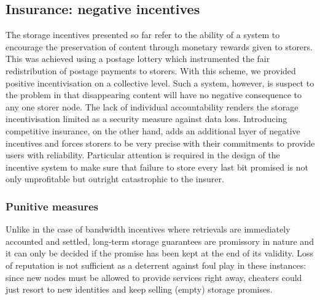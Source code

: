 




\subsection{Insurance: negative incentives \statusorange}\label{sec:chunk-insurance}


The storage incentives presented so far refer to the ability of a system to encourage the preservation of content through monetary rewards given to storers. This was achieved using a postage lottery which instrumented the fair redistribution of postage payments to storers. With this scheme, we provided positive incentivisation on a collective level. Such a system,  however, is suspect to the  problem in that disappearing content will have no negative consequence to any one storer node. The lack of individual accountability renders the storage incentivisation limited as a security measure against data loss. Introducing competitive insurance, on the other hand, adds an additional layer of negative incentives and forces storers to be very precise with their commitments to provide users with reliability. Particular attention is required in the design of the incentive system to make sure that failure to store every last bit promised is not only unprofitable but outright catastrophic to the insurer. 

\subsubsection{Punitive measures}

Unlike in the case of bandwidth incentives where retrievals are immediately accounted and settled, long-term storage guarantees are promissory in nature and it can only be decided if the promise has been kept at the end of its validity. Loss of reputation is not sufficient as a deterrent against foul play in these instances: since new nodes must be allowed to provide services right away, cheaters could just resort to new identities and keep selling (empty) storage promises.

